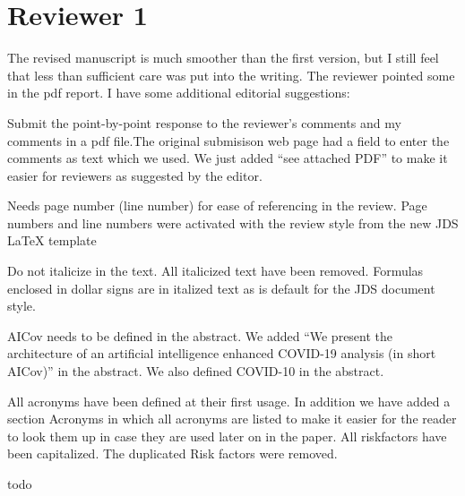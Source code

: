 \section*{Reviewer 1}

The revised manuscript is much smoother than the first version, but I
still feel that less than sufficient care was put into the
writing. The reviewer pointed some in the pdf report. I have some
additional editorial suggestions:

\bigskip

   {Submit the point-by-point response to the
    reviewer's comments and my comments in a pdf file.}{The original
    submisison web page had a field to enter the comments as text
    which we used. We just added ``see attached PDF'' to make it
    easier for reviewers as suggested by the editor.}

   {Needs page number (line number) for ease of
    referencing in the review.}
  {Page numbers and line numbers were
    activated with the review style from the new JDS \LaTeX{}
    template}

   {Do not italicize in the text.}
  {All italicized text
    have been removed.  Formulas enclosed in dollar signs are in
    italized text as is default for the JDS document style.}


   {AICov needs to be defined in the abstract.}
  {We added ``We present the architecture of an artificial
    intelligence enhanced COVID-19 analysis (in short AICov)''
  in the abstract. We also defined COVID-10 in the abstract.}

  {All acronyms have been defined at their first usage. In addition
    we have added a section Acronyms in which all acronyms are listed
    to make it easier for the reader to look them up in case they are
    used later on in the paper. All riskfactors have been capitalized.
    The duplicated Risk factors were removed.
  }
  

  { todo}



